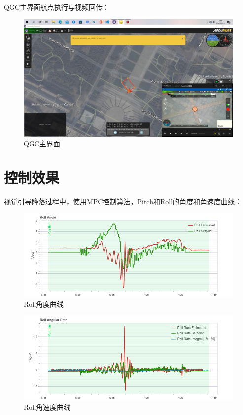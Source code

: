QGC主界面航点执行与视频回传：
\begin{figure}[H]
  \centering
  \includegraphics[width=0.8\linewidth]{./Figure/QGC_Mission_2.jpg}
  \caption{QGC主界面}\label{Fig:append_img9}
\end{figure}

\section{控制效果}

视觉引导降落过程中，使用MPC控制算法，Pitch和Roll的角度和角速度曲线：
\begin{figure}[H]
    \centering
    \includegraphics[width=0.8\linewidth]{./Figure/Roll_Angle_Plot.png}
    \caption{Roll角度曲线}\label{Fig:append_img10}
\end{figure}

\begin{figure}[H]
    \centering
    \includegraphics[width=0.8\linewidth]{./Figure/Roll_Angular_Plot.png}
    \caption{Roll角速度曲线}\label{Fig:append_img11}
\end{figure}

